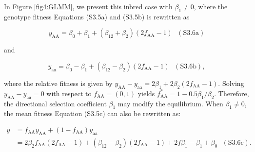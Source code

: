 \documentclass[12pt,]{article}
\begin{document}
In Figure \ref{fig4:GLMM}, we present this inbred case with $\beta_1 \neq 0$, where the genotype fitness Equations (S3.5a) and (S3.5b) is rewritten as

$$y_\mathrm{AA} = \beta_0 + \beta_1 + (\beta_{12}+\beta_2)(2f_\mathrm{AA}-1)~~~(\mathrm{S3.6a})$$

\noindent
and

$$y_\mathrm{aa} = \beta_0 - \beta_1 + (\beta_{12}-\beta_2)(2f_\mathrm{AA}-1)~~~(\mathrm{S3.6b}),$$

\noindent
where the relative fitness is given by $y_\mathrm{AA} - y_\mathrm{aa} = 2\beta_1 + 2\beta_2(2f_\mathrm{AA}-1)$. Solving $y_\mathrm{AA} - y_\mathrm{aa} = 0$ with respect to $f_\mathrm{AA} = (0,1)$ yields $f^*_\mathrm{AA} = 1 - 0.5\beta_1 / \beta_2$. Therefore, the directional selection coefficient $\beta_1$ may modify the equilibrium. When $\beta_1 \neq 0$, the mean fitness Equation (S3.5c) can also be rewritten as:

\begin{equation*}
\begin{split}
\bar{y} &= f_\mathrm{AA}y_\mathrm{AA} + (1-f_\mathrm{AA})y_\mathrm{aa} \\
&= 2\beta_{2}f_\mathrm{AA}(2f_\mathrm{AA}-1) + (\beta_{12}-\beta_2)(2f_\mathrm{AA}-1) + 2f\beta_1 - \beta_1 + \beta_0~~~(\mathrm{S3.6c}). 
\end{split}
\end{equation*}
\end{document}

